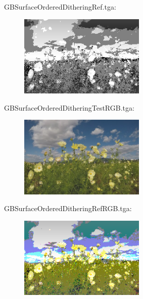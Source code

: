 GBSurfaceOrderedDitheringRef.tga:\\
\begin{center}
\begin{figure}[H]
\centering\includegraphics[width=6cm]{./GBSurfaceOrderedDitheringRef.png}\\
\end{figure}
\end{center}

GBSurfaceOrderedDitheringTestRGB.tga:\\
\begin{center}
\begin{figure}[H]
\centering\includegraphics[width=6cm]{./GBSurfaceOrderedDitheringTestRGB.png}\\
\end{figure}
\end{center}

GBSurfaceOrderedDitheringRefRGB.tga:\\
\begin{center}
\begin{figure}[H]
\centering\includegraphics[width=6cm]{./GBSurfaceOrderedDitheringRefRGB.png}\\
\end{figure}
\end{center}

